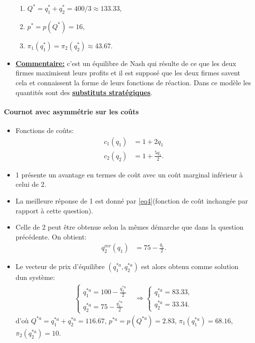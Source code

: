 \begin{frame}[allowframebreaks]{\insertsection}
\begin{itemize}
        \begin{enumerate}[-]
        \item $Q^* = q_1^* +q_2^* = 400/3\approx 133.33$,
        \item $p^* = p(Q^*) = 16$,
        \item $\pi_1(q_1^*) = \pi_2(q_2^*) \approx 43.67$.
        \end{enumerate}
        \item \textbf{\underline{Commentaire:}} c'est un équilibre de Nash qui résulte de ce que les deux firmes maximisent leurs profits et il est supposé 
        que les deux firmes savent cela et connaissent la forme de leurs fonctions de réaction. 
        Dans ce modèle les quantités sont des \underline{\textbf{substituts stratégiques}}.
    \end{itemize}
\end{frame}   

\begin{frame}[allowframebreaks]{\insertsection}
\framesubtitle{Cournot avec asymmétrie sur les coûts}
    \begin{itemize}
        \item Fonctions de coûts: 
        \begin{align*}
            c_1(q_1) &= 1+2q_1\\
            c_2(q_2) &= 1+\frac{5q_1}{2}.
        \end{align*}
        \item 1 présente un avantage en termes de coût avec un coût marginal inférieur à celui de 2.
        \item La meilleure réponse de 1 est donné par \eqref{eq4}(fonction de coût inchangée par rapport à cette question). 
        \item Celle de 2 peut être obtenue selon la mêmes démarche que dans la question précédente. On obtient: 
        \begin{align*}
            q_2^{mr}(q_1) &= 75 - \frac{q_1}{2}.
        \end{align*}
        \item Le vecteur de prix d'équilibre $(q_1^{*a}, q_2^{*a})$ est alors obtenu comme solution dun système: 
        \begin{align*}
        \left\{
        \begin{array}{l}
        q_1^{*a} = 100 - \frac{q_2^{*a}}{2}\\
        q_2^{*a} = 75 - \frac{q_1^{*a}}{2}
        \end{array}
        \right.
        &\Rightarrow 
        \left\{
        \begin{array}{l}
        q_1^{*a} =83.33,\\
         q_2^{*a} = 33.34.
        \end{array} \right.
        \end{align*}
       d'où 
       $Q^{*a} = q_1^{*a} + q_2^{*a} = 116.67$, $p^{*a} = p(Q^{*a}) = 2.83$, $\pi_1(q_1^{*a}) = 68.16$, $\pi_2(q_2^{*a}) = 10$.
 
    \end{itemize}

\end{frame}

